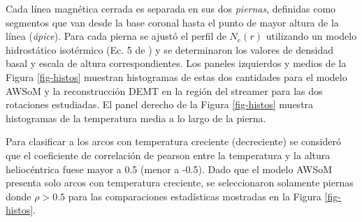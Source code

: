 \documentclass[baaa]{baaa}
\begin{document}
Cada línea magnética cerrada es separada en sus dos \emph{piernas}, definidas como segmentos que van desde la base coronal hasta el punto de mayor altura de la línea (\emph{ápice}). Para cada  pierna  se ajustó el perfil de $N_e(r)$ utilizando un modelo hidrostático isotérmico (Ec. 5 de \citet{lloveras_2017}) y se determinaron los valores de densidad basal y escala de altura correspondientes. Los paneles izquierdos y medios de la Figura \ref{fig-histos} muestran histogramas de estas dos cantidades para el modelo AWSoM y la reconstrucción DEMT en la región del streamer para las dos rotaciones estudiadas. El panel derecho de la Figura \ref{fig-histos} muestra histogramas de la temperatura media a lo largo de la pierna.


Para clasificar a los arcos con temperatura creciente (decreciente) se consideró que el coeficiente de correlación de pearson entre la temperatura y la altura heliocéntrica fuese mayor a 0.5 (menor a -0.5). Dado que el modelo AWSoM presenta solo arcos con temperatura creciente, se seleccionaron solamente piernas donde $\rho> 0.5$ para las comparaciones estadísticas mostradas en la Figura \ref{fig-histos}. %

\end{document}
